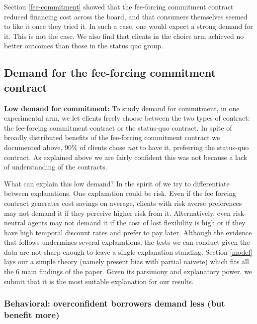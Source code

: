 \documentclass[oneside,11pt]{article}
\begin{document}
Section \ref{fee-commitment} showed that the fee-forcing commitment contract reduced financing cost across the board, and that consumers themselves seemed to like it once they tried it. In such a case, one would expect a strong demand for it. This is not the case. We also find that clients in the choice arm achieved no better outcomes than those in the status quo group.

\subsection{Demand for the fee-forcing commitment contract} \label{sec:demand}

\noindent \textbf{Low demand for commitment:} To study demand for commitment, in one experimental arm, we let clients freely choose between the two types of contract: the fee-forcing commitment contract or the status-quo contract. In spite of broadly distributed benefits of the fee-forcing commitment contract we documented above, 90\% of clients chose \textit{not} to have it, preferring the status-quo contract. As explained above we are fairly confident this was not because a lack of understanding of the contracts. 

\vspace{.1in}
\noindent What can explain this low demand? In the spirit of \cite{Blumenstock} we try to differentiate between explanations. One explanation could be risk. Even if the fee forcing contract generates cost savings on average, clients with risk averse preferences may not demand it if they perceive higher risk from it.   Alternatively, even risk-neutral agents may not demand it if the cost of lost flexibility is high or if they have high temporal discount rates and prefer to pay later. %
Although the evidence that follows undermines several explanations, the tests we can conduct given the data are not sharp enough to leave a single explanation standing. Section \ref{model} lays our a simple theory (namely present bias with partial naivete) which fits all the 6 main findings of the paper. Given its parsimony and explanatory power, we submit that it is the most suitable explanation for our results.


\subsubsection{Behavioral: overconfident borrowers demand less (but benefit more)} \label{behavioral}
\end{document}
